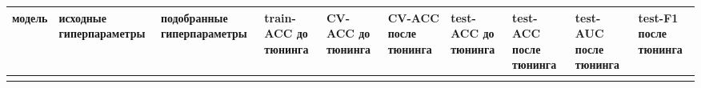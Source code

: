 \documentclass[11pt]{article}
\newcounter{none}
\begin{document}
{\def\LTcaptype{none} %
\begin{longtable}[]{@{}
  >{\raggedright\arraybackslash}p{}
  >{\raggedright\arraybackslash}p{}
  >{\raggedright\arraybackslash}p{}
  >{\raggedleft\arraybackslash}p{}
  >{\raggedleft\arraybackslash}p{}
  >{\raggedleft\arraybackslash}p{}
  >{\raggedleft\arraybackslash}p{}
  >{\raggedleft\arraybackslash}p{}
  >{\raggedleft\arraybackslash}p{}
  >{\raggedleft\arraybackslash}p{}@{}}
\toprule\noalign{}
\begin{minipage}[b]{\linewidth}\raggedright
модель
\end{minipage} & \begin{minipage}[b]{\linewidth}\raggedright
исходные гиперпараметры
\end{minipage} & \begin{minipage}[b]{\linewidth}\raggedright
подобранные гиперпараметры
\end{minipage} & \begin{minipage}[b]{\linewidth}\raggedleft
train-ACC до тюнинга
\end{minipage} & \begin{minipage}[b]{\linewidth}\raggedleft
CV-ACC до тюнинга
\end{minipage} & \begin{minipage}[b]{\linewidth}\raggedleft
CV-ACC после тюнинга
\end{minipage} & \begin{minipage}[b]{\linewidth}\raggedleft
test-ACC до тюнинга
\end{minipage} & \begin{minipage}[b]{\linewidth}\raggedleft
test-ACC после тюнинга
\end{minipage} & \begin{minipage}[b]{\linewidth}\raggedleft
test-AUC после тюнинга
\end{minipage} & \begin{minipage}[b]{\linewidth}\raggedleft
test-F1 после тюнинга
\end{minipage} \\
\midrule\noalign{}
\endhead
\bottomrule\noalign{}

\end{longtable}}
\end{document}
